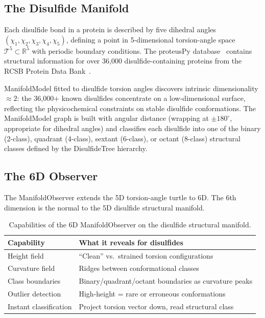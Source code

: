 \documentclass[12pt,letterpaper]{article}
\newcommand{\RR}{\mathbb{R}}
\begin{document}
\subsection{The Disulfide Manifold}

Each disulfide bond in a protein is described by five dihedral angles
$(\chi_1,\chi_2,\chi_3,\chi_4,\chi_5)$, defining a point in 5-dimensional
torsion-angle space $\mathcal{T}^5 \subset \RR^5$ with periodic boundary
conditions.  The proteusPy database~\cite{suchanek24joss} contains structural
information for over 36{,}000 disulfide-containing proteins from the RCSB
Protein Data Bank~\cite{pdb00}.

ManifoldModel fitted to disulfide torsion angles discovers intrinsic
dimensionality $\approx 2$: the 36{,}000$+$ known disulfides concentrate on a
low-dimensional surface, reflecting the physicochemical constraints on stable
disulfide conformations.  The ManifoldModel graph is built with angular distance
(wrapping at $\pm180^\circ$, appropriate for dihedral angles) and classifies
each disulfide into one of the binary (2-class), quadrant (4-class), sextant
(6-class), or octant (8-class) structural classes defined by the DisulfideTree
hierarchy.

\subsection{The 6D Observer}

The ManifoldObserver extends the 5D torsion-angle turtle to 6D.  The 6th
dimension is the normal to the 5D disulfide structural manifold.

\begin{table}[h]
\centering
\caption{Capabilities of the 6D ManifoldObserver on the disulfide structural
  manifold.}
\label{tab:disulfide_observer}
\begin{tabular}{ll}
\toprule
\textbf{Capability} & \textbf{What it reveals for disulfides} \\
\midrule
Height field      & ``Clean'' vs.\ strained torsion configurations \\
Curvature field   & Ridges between conformational classes \\
Class boundaries  & Binary/quadrant/octant boundaries as curvature peaks \\
Outlier detection & High-height = rare or erroneous conformations \\
Instant classification & Project torsion vector down, read structural class \\
\bottomrule
\end{tabular}
\end{table}
\end{document}
